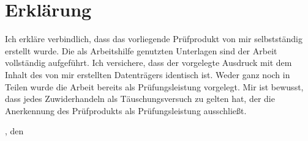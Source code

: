 \chapter{Erklärung}\label{ch:erklaerung}
Ich erkläre verbindlich, dass das vorliegende Prüfprodukt von mir selbstständig erstellt wurde.
Die als Arbeitshilfe genutzten Unterlagen sind der Arbeit vollständig aufgeführt.
Ich versichere, dass der vorgelegte Ausdruck mit dem Inhalt des von mir erstellten Datenträgers identisch ist.
Weder ganz noch in Teilen wurde die Arbeit bereits als Prüfungsleistung vorgelegt.
Mir ist bewusst, dass jedes Zuwiderhandeln als Täuschungsversuch zu gelten hat, der die Anerkennung des Prüfprodukts als Prüfungsleistung ausschließt.
\bigskip

\begingroup
\setlength{\parindent}{0pt} %

\locationDocument, den \dateDocument
\bigskip
\bigskip

\newlength{\widthbox}
\settowidth{\widthbox}{\locationDocument, den \dateDocument}

\makebox[\widthbox]{\hrulefill}\\
\authorDocument
\endgroup


